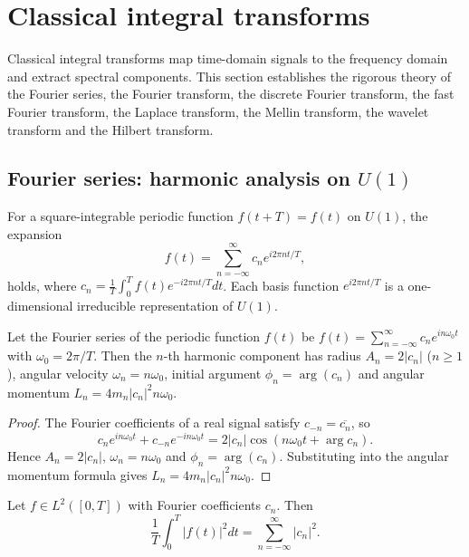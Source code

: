 \section{\texorpdfstring{Classical integral transforms}{Classical integral transforms}}

Classical integral transforms map time-domain signals to the frequency domain and extract spectral components. This section establishes the rigorous theory of the Fourier series, the Fourier transform, the discrete Fourier transform, the fast Fourier transform, the Laplace transform, the Mellin transform, the wavelet transform and the Hilbert transform.

\subsection{\texorpdfstring{Fourier series: harmonic analysis on $U(1)$}{Fourier series}}

\begin{definition}\label{def:fourier_series}
For a square-integrable periodic function $f(t+T)=f(t)$ on $U(1)$, the expansion
\[f(t) = \sum_{n=-\infty}^{\infty} c_n e^{i 2\pi n t / T},\]
holds, where $c_n = \frac{1}{T} \int_0^T f(t) e^{-i 2\pi n t / T} dt$. Each basis function $e^{i 2\pi n t / T}$ is a one-dimensional irreducible representation of $U(1)$.
\end{definition}

\begin{proposition}\label{prop:fourier_epicycle}
Let the Fourier series of the periodic function $f(t)$ be $f(t) = \sum_{n=-\infty}^{\infty} c_n e^{i n \omega_0 t}$ with $\omega_0 = 2\pi/T$. Then the $n$-th harmonic component has radius $A_n = 2|c_n|$ ($n \ge 1$), angular velocity $\omega_n = n\omega_0$, initial argument $\phi_n = \arg(c_n)$ and angular momentum $L_n = 4m_n |c_n|^2 n\omega_0$.
\end{proposition}

\begin{proof}
The Fourier coefficients of a real signal satisfy $c_{-n} = \overline{c_n}$, so
\[
c_n e^{in\omega_0 t} + c_{-n} e^{-in\omega_0 t} = 2|c_n| \cos(n\omega_0 t + \arg c_n).
\]
Hence $A_n = 2|c_n|$, $\omega_n = n\omega_0$ and $\phi_n = \arg(c_n)$. Substituting into the angular momentum formula gives $L_n = 4m_n |c_n|^2 n\omega_0$.
\end{proof}

\begin{theorem}\label{thm:parseval_fourier}
Let $f \in L^2([0,T])$ with Fourier coefficients $c_n$. Then
\[\frac{1}{T}\int_0^T |f(t)|^2 dt = \sum_{n=-\infty}^{\infty} |c_n|^2.\]
\end{theorem}

